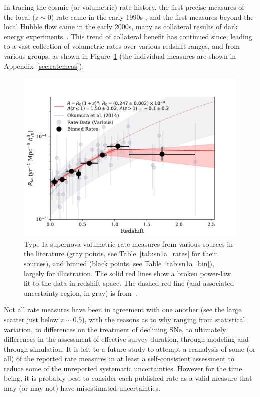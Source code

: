 \documentclass[apj]{aastex62}
\begin{document}
In tracing the cosmic (or volumetric) rate history, the first precise measures of the local ($z\sim0$) rate came in the early 1990s \cite[cf.][]{Cappellaro:1993qm,Cappellaro:1999}, and the first measures beyond the local Hubble flow came in the early 2000s, many as collateral results of dark energy experiments~\citep{Riess:1998,Perlmutter:1999}. This trend of collateral benefit has continued since, leading to a vast collection of volumetric rates over various redshift ranges, and from various groups, as shown in Figure~\ref{fig:sn1a_rates} (the individual measures are shown in Appendix~\ref{sec:ratemeas}). 

\begin{figure}[t]
   \centering
   \includegraphics[width=6.1in]{figure_SNIa_rate_z_pwr_fit.pdf}
   \caption{\footnotesize Type Ia supernova volumetric rate measures from various sources in the literature (gray points, see Table~\ref{tab:sn1a_rates} for their sources), and binned (black points, see Table~\ref{tab:sn1a_bin}), largely for illustration. The solid red lines show a broken power-law fit to the data in redshift space. The dashed red line (and associated uncertainty region, in gray) is from~\cite{Okumura:2014}.}
   \label{fig:sn1a_rates}
\end{figure}

Not all rate measures have been in  agreement with one another (see the large scatter just below $z\sim0.5$), with the reasons as to why ranging from statistical variation, to differences on the treatment of declining SNe, to ultimately differences in the assessment of effective survey duration, through modeling and through simulation. It is left to a future study to attempt a reanalysis of some (or all) of the reported rate measures in at least a self-consistent assessment to reduce some of the unreported systematic uncertainties. However for the time being, it is probably best to consider each published rate as a valid measure that may (or may not) have misestimated uncertainties. 
\end{document}
